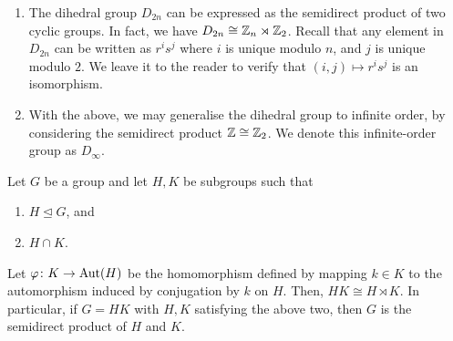 \begin{ex}
    \phantom{hi}
    \begin{enumerate}
        \item The dihedral group $D_{2n}$ can be expressed as the semidirect product of two cyclic groups. In fact, we have $D_{2n} \cong \mathbb{Z}_n \rtimes \mathbb{Z}_2$. Recall that any element in $D_{2n}$ can be written as $r^is^j$ where $i$ is unique modulo $n$, and $j$ is unique modulo $2$. We leave it to the reader to verify that $(i,j) \mapsto r^is^j$ is an isomorphism. 
        
        \item With the above, we may generalise the dihedral group to infinite order, by considering the semidirect product $\mathbb{Z} \cong \mathbb{Z}_2$. We denote this infinite-order group as $D_{\infty}$. 
    \end{enumerate}
\end{ex}

\begin{theorem}
    Let $G$ be a group and let $H,K$ be subgroups such that 
    \begin{enumerate}
        \item $H \trianglelefteq G$, and
        \item $H \cap K$.
    \end{enumerate}
    Let $\varphi \colon K \to \operatorname{Aut}(H)$ be the homomorphism defined by mapping $k \in K$ to the automorphism induced by conjugation by $k$ on $H$. Then, $HK \cong H \rtimes K$. In particular, if $G = HK$ with $H,K$ satisfying the above two, then $G$ is the semidirect product of $H$ and $K$.
\end{theorem}